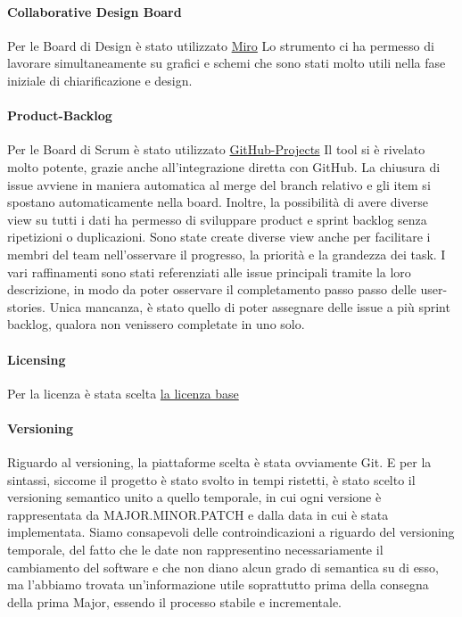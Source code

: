     \paragraph{Collaborative Design Board}
    Per le Board di Design è stato utilizzato \href{https://miro.com/app/board/uXjVPN93uLs=/?share_link_id=56431555728}{Miro} Lo strumento ci ha permesso di lavorare simultaneamente su grafici e schemi che sono stati molto utili nella fase iniziale di chiarificazione e design. 

    \paragraph{Product-Backlog}
    Per le Board di Scrum è stato utilizzato \href{https://github.com/orgs/ISIQuiz/projects/3}{GitHub-Projects} Il tool si è rivelato molto potente, grazie anche all'integrazione diretta con GitHub. La chiusura di issue avviene in maniera automatica al merge del branch relativo e gli item si spostano automaticamente nella board. Inoltre, la possibilità di avere diverse view su tutti i dati ha permesso di sviluppare product e sprint backlog senza ripetizioni o duplicazioni. Sono state create diverse view anche per facilitare i membri del team nell'osservare il progresso, la priorità e la grandezza dei task. I vari raffinamenti sono stati referenziati alle issue principali tramite la loro descrizione, in modo da poter osservare il completamento passo passo delle user-stories. Unica mancanza, è stato quello di poter assegnare delle issue a più sprint backlog, qualora non venissero completate in uno solo. 
    
    \paragraph{Licensing} 
    Per la licenza è stata scelta \href{https://choosealicense.com/licenses/}{la licenza base}
    
    \paragraph{Versioning}
    Riguardo al versioning, la piattaforme scelta è stata ovviamente Git. E per la sintassi, siccome il progetto è stato svolto in tempi ristetti, è stato scelto il versioning semantico unito a quello temporale, in cui ogni versione è rappresentata da MAJOR.MINOR.PATCH e dalla data in cui è stata implementata. Siamo consapevoli delle controindicazioni a riguardo del versioning temporale, del fatto che le date non rappresentino necessariamente il cambiamento del software e che non diano alcun grado di semantica su di esso, ma l'abbiamo trovata un'informazione utile soprattutto prima della consegna della prima Major, essendo il processo stabile e incrementale.
    

